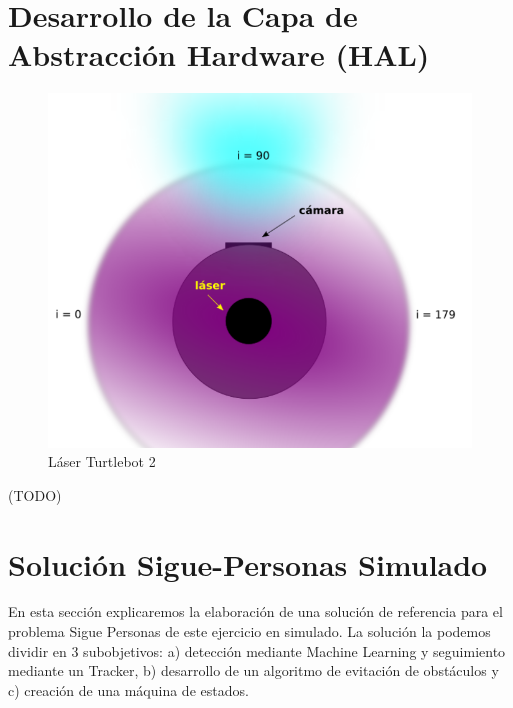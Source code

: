 \section{Desarrollo de la Capa de Abstracción Hardware (HAL)}
\label{sec:turtlebot2_hal_simulado}

\begin{figure} [H]
  \begin{center}
    \includegraphics[width=15cm]{imagenes/vista-planta-turtlebot2.png}
  \end{center}
  \caption[Láser Turtlebot 2]{Láser Turtlebot 2}
  \label{fig:vista_planta_turtlebot2}
\end{figure}
(TODO)




\section{Solución Sigue-Personas Simulado}
\label{sec:sigue_personas_simulado}

En esta sección explicaremos la elaboración de una solución de referencia para el problema Sigue Personas de este ejercicio en simulado. La solución la podemos dividir en 3 subobjetivos: a) detección mediante Machine Learning y seguimiento mediante un Tracker, b) desarrollo de un algoritmo de evitación de obstáculos y c) creación de una máquina de estados.

